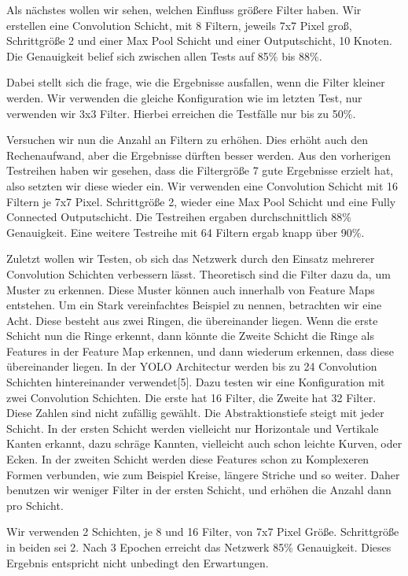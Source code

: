 \documentclass[12pt]{article}
\begin{document}
Als nächstes wollen wir sehen, welchen Einfluss größere Filter haben. Wir erstellen eine Convolution Schicht, mit 8 Filtern, jeweils 7x7 Pixel groß, Schrittgröße 2 und einer Max Pool Schicht und einer Outputschicht, 10 Knoten.
Die Genauigkeit belief sich zwischen allen Tests auf 85\% bis 88\%. 
	
Dabei stellt sich die frage, wie die Ergebnisse ausfallen, wenn die Filter kleiner werden. Wir verwenden die gleiche Konfiguration wie im letzten Test, nur verwenden wir 3x3 Filter.
Hierbei erreichen die Testfälle nur bis zu 50\%. 

Versuchen wir nun die Anzahl an Filtern zu erhöhen. Dies erhöht auch den Rechenaufwand, aber die Ergebnisse dürften besser werden. Aus den vorherigen Testreihen haben wir gesehen, dass die Filtergröße 7 gute Ergebnisse erzielt hat, also setzten wir diese wieder ein.
Wir verwenden eine Convolution Schicht mit 16 Filtern je 7x7 Pixel. Schrittgröße 2, wieder eine Max Pool Schicht und eine Fully Connected Outputschicht. Die Testreihen ergaben durchschnittlich 88\% Genauigkeit. Eine weitere Testreihe mit 64 Filtern ergab knapp über 90\%.

Zuletzt wollen wir Testen, ob sich das Netzwerk durch den Einsatz mehrerer Convolution Schichten verbessern lässt. Theoretisch sind die Filter dazu da, um Muster zu erkennen. Diese Muster können auch innerhalb von Feature Maps entstehen. Um ein Stark vereinfachtes Beispiel zu nennen, betrachten wir eine Acht. Diese besteht aus zwei Ringen, die übereinander liegen. Wenn die erste Schicht nun die Ringe erkennt, dann könnte die Zweite Schicht die Ringe als Features in der Feature Map erkennen, und dann wiederum erkennen, dass diese übereinander liegen. In der YOLO Architectur werden bis zu 24 Convolution Schichten hintereinander verwendet[5]. Dazu testen wir eine Konfiguration mit zwei Convolution Schichten. Die erste hat 16 Filter, die Zweite hat 32 Filter. Diese Zahlen sind nicht zufällig gewählt. Die Abstraktionstiefe steigt mit jeder Schicht. In der ersten Schicht werden vielleicht nur Horizontale und Vertikale Kanten erkannt, dazu schräge Kannten, vielleicht auch schon leichte Kurven, oder Ecken. In der zweiten Schicht werden diese Features schon zu Komplexeren Formen verbunden, wie zum Beispiel Kreise, längere Striche und so weiter.
Daher benutzen wir weniger Filter in der ersten Schicht, und erhöhen die Anzahl dann pro Schicht.

Wir verwenden 2 Schichten, je 8 und 16 Filter, von 7x7 Pixel Größe. Schrittgröße in beiden sei 2. Nach 3 Epochen erreicht das Netzwerk 85\% Genauigkeit. Dieses Ergebnis entspricht nicht unbedingt den Erwartungen. 
\end{document}
